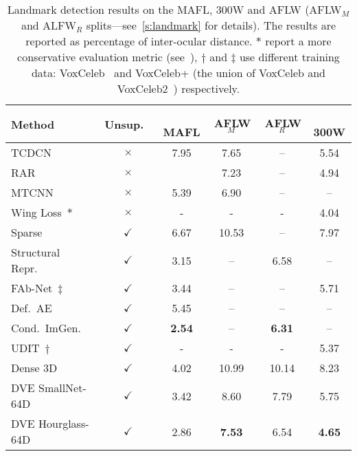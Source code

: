\documentclass[10pt,twocolumn,letterpaper]{article}
\begin{document}
\begin{table}[t]
\setlength\tabcolsep{1pt}
\centering

\begin{tabular}{l@{\hskip -0.3cm}c@{\hskip -0.1cm}cccc}
\toprule
Method                      & Unsup.\ \,      & \,MAFL    & \,AFLW$_M$ & \,AFLW$_R$     & \,\,300W  \\
\midrule
TCDCN~\cite{Zhang2016}      &$\times$      & 7.95    &  7.65  & --        & 5.54  \\
RAR~\cite{Xiao2016}         &$\times$      &         & 7.23 & -- & 4.94  \\
MTCNN~\cite{zhang2014facial,zhang2018unsupervised}  &$\times$      &   5.39  & 6.90  & --  &  -- \\
Wing Loss~\cite{feng2018wing}$\ast$    &$\times$      &   -  & -  & -  &  4.04 \\                                                                       
\midrule
Sparse~\cite{thewlis17unsupervised}  & $\checkmark$ & 6.67 &  10.53 & -- & 7.97 \\
Structural Repr.~\cite{zhang2018unsupervised} & $\checkmark$ & 3.15 & -- & 6.58 & -- \\
FAb-Net~\cite{Wiles18a}$\ddagger$ & $\checkmark$  & 3.44 & -- & -- & 5.71\\
Def.~AE~\cite{shu2018deforming} & $\checkmark$ & 5.45 & -- & --  & --\\
Cond.~ImGen.~\cite{jakab2018unsupervised} & $\checkmark$ & \textbf{2.54} & -- & \textbf{6.31}  & --\\
UDIT~\cite{jakab2019learning}$\dagger$ & $\checkmark$ & - & - & - & 5.37 \\
Dense 3D~\cite{thewlis17Bunsupervised} & $\checkmark$ & 4.02 & 10.99 & 10.14 & 8.23\\
DVE SmallNet-64D  & $\checkmark$                  & 3.42 & 8.60 & 7.79 & 5.75  \\
DVE Hourglass-64D  & $\checkmark$ & 2.86 & \textbf{7.53} & 6.54 & \textbf{4.65}  \\
\bottomrule
\end{tabular}
\medskip
\caption{Landmark detection results on the MAFL, 300W and AFLW (AFLW$_M$ and ALFW$_R$ splits---see~\cref{s:landmark} for details). The results are reported as percentage of inter-ocular distance. $\ast$ report a more conservative evaluation metric (see~\cite{feng2018wing}),  $\dagger$ and $\ddagger$ use different training data: VoxCeleb~\cite{Nagrani17} and VoxCeleb+ (the union of VoxCeleb and VoxCeleb2~\cite{Chung18b}) respectively.
\label{t:landmark}}
\end{table}
\end{document}
